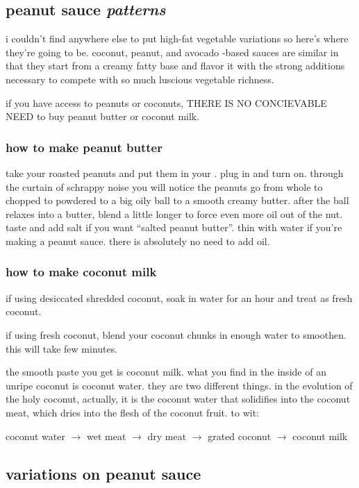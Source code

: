 \subsection{peanut sauce \textit{patterns}}

i couldn't find anywhere else to put high-fat vegetable variations so here's 
where they're going to be. coconut, peanut, and avocado -based sauces are 
similar in that they start from a creamy fatty base and flavor it with the 
strong additions necessary to compete with so much luscious vegetable richness.

if you have access to peanuts or coconuts, THERE IS NO CONCIEVABLE NEED to buy 
peanut butter or coconut milk.

\subsubsection{how to make peanut butter}

take your roasted peanuts and put them in your . plug in and turn on.
through the curtain of schrappy noise you will notice the peanuts go from 
whole to chopped to powdered to a big oily ball to a smooth creamy butter. 
after the ball relaxes into a butter, blend a little longer to force even 
more oil out of the nut. taste and add salt if you want ``salted peanut 
butter''. thin with water if you're making a peanut sauce. there is absolutely 
no need to add oil.

\subsubsection{how to make coconut milk}

if using desiccated shredded coconut, soak in water for an hour and treat as 
fresh coconut.

if using fresh coconut, blend your coconut chunks in enough water to smoothen. 
this will take few minutes.

the smooth paste you get is coconut milk. what you find in the inside of an 
unripe coconut is coconut water. they are two different things. in the 
evolution of the holy coconut, actually, it is the coconut water that 
solidifies into the coconut meat, which dries into the flesh of the coconut 
fruit. to wit:

\textsf{coconut water $\rightarrow$ wet meat $\rightarrow$ dry meat 
$\rightarrow$ grated coconut $\rightarrow$ coconut milk}

\subsection{variations on peanut sauce}

